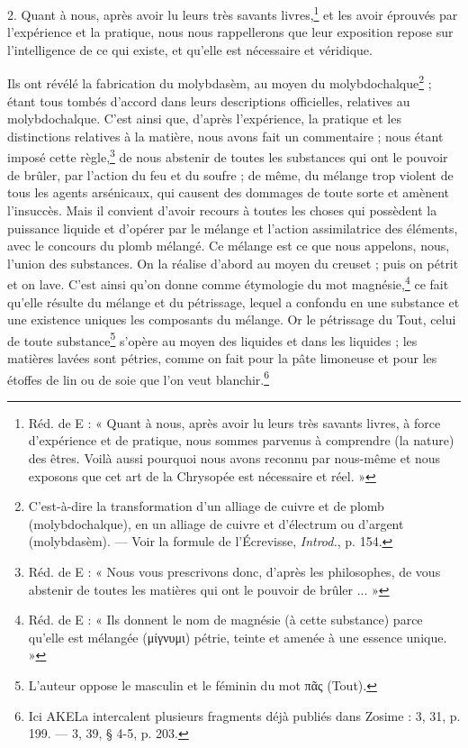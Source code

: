 \documentclass[a4paper, 11pt, oneside, polutonikogreek, french]{article}
\begin{document}
2. Quant à nous, après avoir lu leurs très savants livres,\footnote{Réd. de E : « Quant à nous, après avoir lu leurs très savants livres, à force d'expérience et de pratique, nous sommes parvenus à comprendre (la nature) des êtres. Voilà aussi pourquoi nous avons reconnu par nous-même et nous exposons que cet art de la Chrysopée est nécessaire et réel. »} et les avoir éprouvés par l'expérience et la pratique, nous nous rappellerons que leur exposition repose sur l'intelligence de ce qui existe, et qu'elle est nécessaire et véridique.

Ils ont révélé la fabrication du molybdasèm, au moyen du molybdochalque\footnote{C'est-à-dire la transformation d'un alliage de cuivre et de plomb (molybdochalque), en un alliage de cuivre et d'électrum ou d'argent (molybdasèm). --- Voir la formule de l'Écrevisse, \emph{Introd.}, p. 154.} ; étant tous tombés d'accord dans leurs descriptions officielles, relatives au molybdochalque. C'est ainsi que, d'après l'expérience, la pratique et les distinctions relatives à la matière, nous avons fait un commentaire ; nous étant imposé cette règle,\footnote{Réd. de E : « Nous vous prescrivons donc, d'après les philosophes, de vous abstenir de toutes les matières qui ont le pouvoir de brûler ... »} de nous abstenir de toutes les substances qui ont le pouvoir de brûler, par l'action du feu et du soufre ; de même, du mélange trop violent de tous les agents arsénicaux, qui causent des dommages de toute sorte et amènent l'insuccès. Mais il convient d'avoir recours à toutes les choses qui possèdent la puissance liquide et d'opérer par le mélange et l'action assimilatrice des éléments, avec le concours du plomb mélangé. Ce mélange est ce que nous appelons, nous, l'union des substances. On la réalise d'abord au moyen du creuset ; puis on pétrit et on lave. C'est ainsi qu'on donne comme étymologie du mot magnésie,\footnote{Réd. de E : « Ils donnent le nom de magnésie (à cette substance) parce qu'elle est mélangée (μίγνυμι) pétrie, teinte et amenée à une essence unique. »} ce fait qu'elle résulte du mélange et du pétrissage, lequel a confondu en une substance et une existence uniques les composants du mélange. Or le pétrissage du Tout, celui de toute substance\footnote{L'auteur oppose le masculin et le féminin du mot πᾶς (Tout).} s'opère au moyen des liquides et dans les liquides ; les matières lavées sont pétries, comme on fait pour la pâte limoneuse et pour les étoffes de lin ou de soie que l'on veut blanchir.\footnote{Ici AKELa intercalent plusieurs fragments déjà publiés dans Zosime : 3, 31, p. 199. --- 3, 39, § 4-5, p. 203.}
\end{document}
